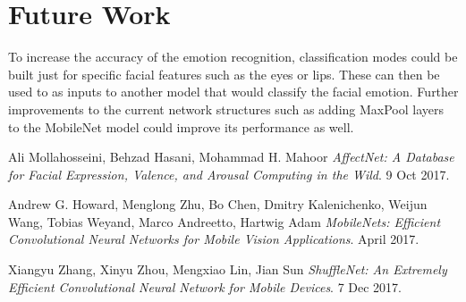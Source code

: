 \documentclass[10pt,twocolumn,letterpaper]{article}
\begin{document}
\section{Future Work}
To increase the accuracy of the emotion recognition, classification modes could be built just for specific facial features such as the eyes or lips. These can then be used to as inputs to another model that would classify the facial emotion.
Further improvements to the current network structures such as adding MaxPool layers to the MobileNet model could improve its performance as well.


{\small




\begin{thebibliography}{9}

Ali Mollahosseini, Behzad Hasani, Mohammad H. Mahoor
\textit{ AffectNet: A Database for Facial Expression, Valence, and Arousal Computing in the Wild}. 
9 Oct 2017.

Andrew G. Howard, Menglong Zhu, Bo Chen, Dmitry Kalenichenko, Weijun Wang, Tobias Weyand, Marco Andreetto, Hartwig Adam
\textit{MobileNets: Efficient Convolutional Neural Networks for Mobile Vision Applications}. 
April 2017.

Xiangyu Zhang, Xinyu Zhou, Mengxiao Lin, Jian Sun
\textit{ShuffleNet: An Extremely Efficient Convolutional Neural Network for Mobile Devices}. 
7 Dec 2017.
 

\end{thebibliography}



}
\end{document}
